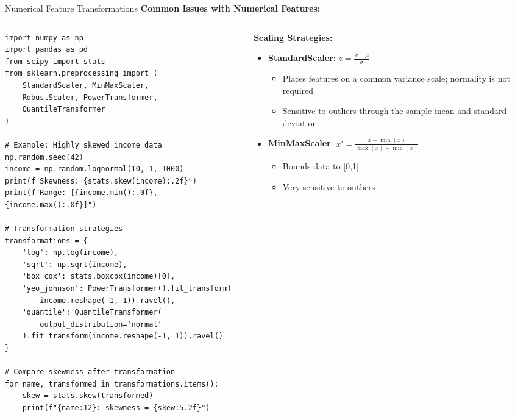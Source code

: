 \documentclass[aspectratio=169,11pt]{beamer}
\begin{document}
\begin{frame}[fragile]{Numerical Feature Transformations}
\textbf{Common Issues with Numerical Features:}

\begin{columns}
\begin{column}{0.5\textwidth}
\begin{lstlisting}
import numpy as np
import pandas as pd
from scipy import stats
from sklearn.preprocessing import (
    StandardScaler, MinMaxScaler, 
    RobustScaler, PowerTransformer,
    QuantileTransformer
)

# Example: Highly skewed income data
np.random.seed(42)
income = np.random.lognormal(10, 1, 1000)
print(f"Skewness: {stats.skew(income):.2f}")
print(f"Range: [{income.min():.0f}, {income.max():.0f}]")

# Transformation strategies
transformations = {
    'log': np.log(income),
    'sqrt': np.sqrt(income),
    'box_cox': stats.boxcox(income)[0],
    'yeo_johnson': PowerTransformer().fit_transform(
        income.reshape(-1, 1)).ravel(),
    'quantile': QuantileTransformer(
        output_distribution='normal'
    ).fit_transform(income.reshape(-1, 1)).ravel()
}

# Compare skewness after transformation
for name, transformed in transformations.items():
    skew = stats.skew(transformed)
    print(f"{name:12}: skewness = {skew:5.2f}")
\end{lstlisting}
\end{column}
\begin{column}{0.5\textwidth}
\textbf{Scaling Strategies:}

\begin{itemize}
\item \textbf{StandardScaler}: $z = \frac{x - \mu}{\sigma}$
  \begin{itemize}
  \item Places features on a common variance scale; normality is not required
  \item Sensitive to outliers through the sample mean and standard deviation
  \end{itemize}

\item \textbf{MinMaxScaler}: $x' = \frac{x - \min(x)}{\max(x) - \min(x)}$
  \begin{itemize}
  \item Bounds data to [0,1]
  \item Very sensitive to outliers
  \end{itemize}


\end{itemize}
\end{column}
\end{columns}
\end{frame}
\end{document}
